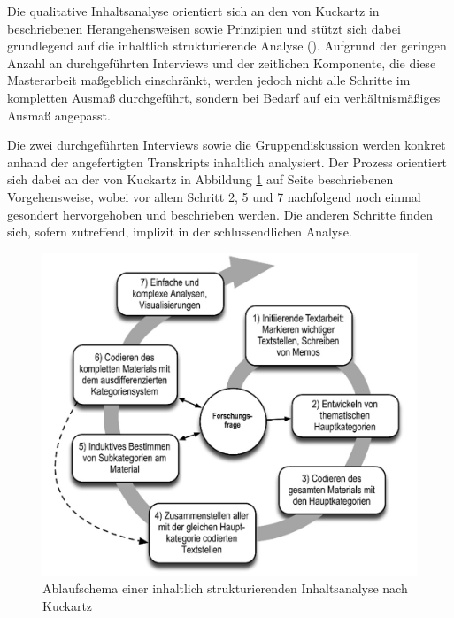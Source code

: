 \documentclass[a4paper,12pt,twoside]{scrreprt}
\begin{document}
Die qualitative Inhaltsanalyse orientiert sich an den von Kuckartz in \cite{kuckartz_qualitative_2018} beschriebenen Herangehensweisen sowie Prinzipien und stützt sich dabei grundlegend auf die inhaltlich strukturierende Analyse (\cite[97-122]{kuckartz_qualitative_2018}). Aufgrund der geringen Anzahl an durchgeführten Interviews und der zeitlichen Komponente, die diese Masterarbeit maßgeblich einschränkt, werden jedoch nicht alle Schritte im kompletten Ausmaß durchgeführt, sondern bei Bedarf auf ein verhältnismäßiges Ausmaß angepasst.

\medskip

Die zwei durchgeführten Interviews sowie die Gruppendiskussion werden konkret anhand der angefertigten Transkripts inhaltlich analysiert. Der Prozess orientiert sich dabei an der von Kuckartz in Abbildung \ref{fig:ablaufschema-inhaltlich-strukturierende-inhaltsanalyse} auf Seite \pageref{fig:ablaufschema-inhaltlich-strukturierende-inhaltsanalyse} beschriebenen Vorgehensweise, wobei vor allem Schritt 2, 5 und 7 nachfolgend noch einmal gesondert hervorgehoben und beschrieben werden. Die anderen Schritte finden sich, sofern zutreffend, implizit in der schlussendlichen Analyse.

\begin{figure}[ht]
    \centering
    \includegraphics[width=.8\linewidth]{thesis/images/Kuckartz_Ablaufschema-inhaltlich-strukturierenden-Inhaltsanalyse.png}
    \caption[blaufschema einer inhaltlich strukturierenden Inhaltsanalyse nach Kuckartz]{Ablaufschema einer inhaltlich strukturierenden Inhaltsanalyse nach Kuckartz \cite[100]{kuckartz_qualitative_2018}}
    \label{fig:ablaufschema-inhaltlich-strukturierende-inhaltsanalyse}
\end{figure}
\end{document}
